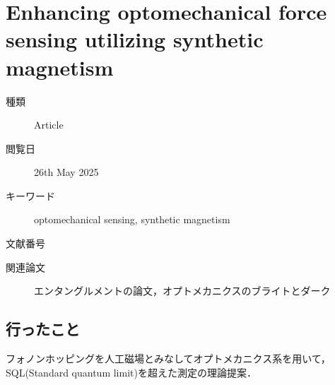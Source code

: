 \documentclass{report}
\begin{document}
  \chapter{Enhancing optomechanical force sensing utilizing synthetic magnetism}
    \begin{boxnote}
      \begin{description}
        \item[種類] Article
        \item[閲覧日] 26th May 2025
        \item[キーワード] optomechanical sensing, synthetic magnetism
        \item[文献番号] \cite{PhysRevA.111.053508}
        \item[関連論文] エンタングルメントの論文\cite{PhysRevLett.129.063602}，オプトメカニクスのブライトとダーク\cite{lake2020two}
      \end{description}
    \end{boxnote}
    \section{行ったこと}
      フォノンホッピングを人工磁場とみなしてオプトメカニクス系を用いて，SQL(Standard quantum limit)を超えた測定の理論提案．
\end{document}
